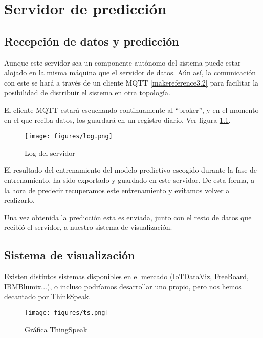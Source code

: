 \cleardoublepage

\chapter{Servidor de predicción}
\label{makereference5}

\section{Recepción de datos y predicción}

Aunque este servidor sea un componente autónomo del sistema puede estar alojado en la misma máquina que el servidor de datos. Aún así, la comunicación con este se hará a través de un cliente MQTT \ref{makereference3.2} para facilitar la posibilidad de distribuir el sistema en otra topología.

El cliente MQTT estará escuchando continuamente al ``broker'', y en el momento en el que reciba datos, los guardará en un registro diario. Ver figura \ref{log}.

	\begin{figure}[htb]
		\begin{center}
			\texttt{[image: figures/log.png]}
			\caption{Log del servidor \label{log}}
		\end{center}
	\end{figure}

El resultado del entrenamiento del modelo predictivo escogido durante la fase de entrenamiento, ha sido exportado y guardado en este servidor. De esta forma, a la hora de predecir recuperamos este entrenamiento y evitamos volver a realizarlo.

Una vez obtenida la predicción esta es enviada, junto con el resto de datos que recibió el servidor, a nuestro sistema de visualización. 

\section{Sistema de visualización}

Existen distintos sistemas disponibles en el mercado (IoTDataViz, FreeBoard, IBMBlumix...), o incluso podríamos desarrollar uno propio, pero nos hemos decantado por \href{https://thingspeak.com/}{ThinkSpeak}.

\begin{figure}[htb]
	\begin{center}
		\texttt{[image: figures/ts.png]}
		\caption{Gráfica ThingSpeak \label{ts}}
	\end{center}
\end{figure}

